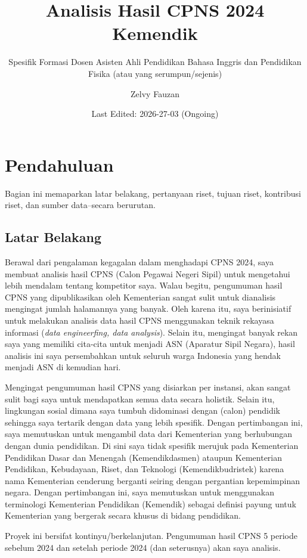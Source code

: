 \documentclass[
]{article}
\title{Analisis Hasil CPNS 2024 Kemendik}
\subtitle{Spesifik Formasi Dosen Asisten Ahli Pendidikan Bahasa Inggris
dan Pendidikan Fisika (atau yang serumpun/sejenis)}
\author{Zelvy Fauzan}
\date{Last Edited: 2026-27-03 (Ongoing)}
\begin{document}
\maketitle

\section{Pendahuluan}\label{pendahuluan}

Bagian ini memaparkan latar belakang, pertanyaan riset, tujuan riset,
kontribusi riset, dan sumber data--secara berurutan.

\subsection{Latar Belakang}\label{latar-belakang}

Berawal dari pengalaman kegagalan dalam menghadapi CPNS 2024, saya
membuat analisis hasil CPNS (Calon Pegawai Negeri Sipil) untuk
mengetahui lebih mendalam tentang kompetitor saya. Walau begitu,
pengumuman hasil CPNS yang dipublikasikan oleh Kementerian sangat sulit
untuk dianalisis mengingat jumlah halamannya yang banyak. Oleh karena
itu, saya berinisiatif untuk melakukan analisis data hasil CPNS
menggunakan teknik rekayasa informasi (\emph{data engineerfing, data
analysis}). Selain itu, mengingat banyak rekan saya yang memiliki
cita-cita untuk menjadi ASN (Aparatur Sipil Negara), hasil analisis ini
saya persembahkan untuk seluruh warga Indonesia yang hendak menjadi ASN
di kemudian hari.

Mengingat pengumuman hasil CPNS yang disiarkan per instansi, akan sangat
sulit bagi saya untuk mendapatkan semua data secara holistik. Selain
itu, lingkungan sosial dimana saya tumbuh didominasi dengan (calon)
pendidik sehingga saya tertarik dengan data yang lebih spesifik. Dengan
pertimbangan ini, saya memutuskan untuk mengambil data dari Kementerian
yang berhubungan dengan dunia pendidikan. Di sini saya tidak spesifik
merujuk pada Kementerian Pendidikan Dasar dan Menengah (Kemendikdasmen)
ataupun Kementerian Pendidikan, Kebudayaan, Riset, dan Teknologi
(Kemendikbudristek) karena nama Kementerian cenderung berganti seiring
dengan pergantian kepemimpinan negara. Dengan pertimbangan ini, saya
memutuskan untuk menggunakan terminologi Kementerian Pendidikan
(Kemendik) sebagai definisi payung untuk Kementerian yang bergerak
secara khusus di bidang pendidikan.

Proyek ini bersifat kontinyu/berkelanjutan. Pengumuman hasil CPNS 5
periode sebelum 2024 dan setelah periode 2024 (dan seterusnya) akan saya
analisis.
\end{document}
